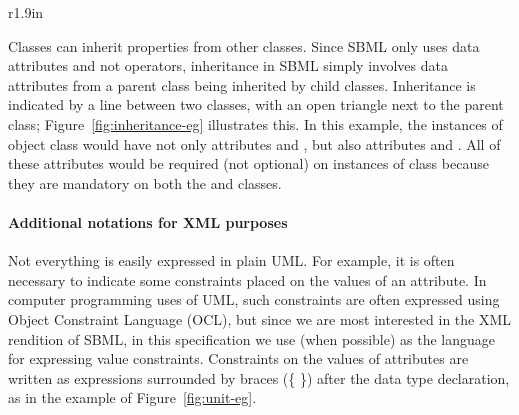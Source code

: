 \begin{wrapfigure}[10]{r}{1.9in}
  \centering
  \small
  \vspace*{-7ex}
  \caption{Inheritance.}
  \label{fig:inheritance-eg}
\end{wrapfigure}
Classes can inherit properties from other classes.  Since SBML
only uses data attributes and not operators, inheritance in SBML
simply involves data attributes from a parent class being
inherited by child classes.  Inheritance is indicated by a line
between two classes, with an open triangle next to the parent
class; Figure~\ref{fig:inheritance-eg} illustrates this.  In this
example, the instances of object class  would have
not only attributes  and , but also attributes
 and .  All of these attributes would be
required (not optional) on instances of class 
because they are mandatory on both the  and
 classes.



\paragraph{Additional notations for XML purposes}

Not everything is easily expressed in plain UML.  For example, it
is often necessary to indicate some constraints placed on the
values of an attribute.  In computer programming uses of UML, such
constraints are often expressed using Object Constraint Language
(OCL), but since we are most interested in the XML rendition of
SBML, in this specification we use \xmlschemaone (when possible)
as the language for expressing value constraints.  Constraints on
the values of attributes are written as expressions surrounded by
braces (\{ \}) after the data type declaration, as in the example
of Figure~\ref{fig:unit-eg}.

